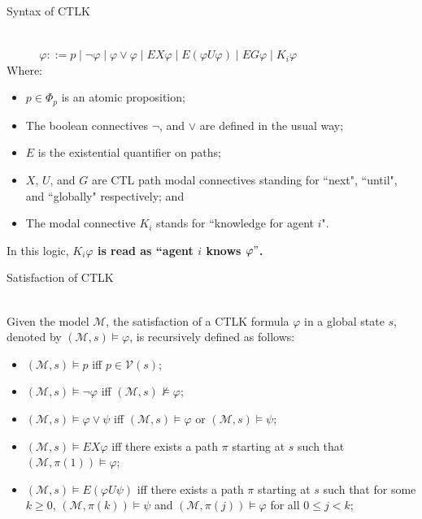 \documentclass{beamer}
\begin{document}
\begin{frame}{Syntax of CTLK}
\begin{definition} \label{Syntax of CTLK}~\\
$~~~~~~~~~~~~~ \varphi ::= p \mid \neg \varphi \mid \varphi \vee
\varphi \mid EX \varphi  \mid E ( \varphi U \varphi) \mid EG
\varphi \mid K_i \varphi$\\
Where:
\begin{itemize}
\item $ p \in \Phi_p$ is an atomic proposition; \item The boolean
connectives $\neg$, and $\vee$ are defined in the usual way; \item
$E$ is the existential quantifier on paths; \item $X$, $U$, and
$G$ are CTL path modal connectives standing for ``next", ``until",
and ``globally" respectively; and \item The modal connective $K_i$
stands for ``knowledge for agent $i$".
\end{itemize}
\label {dfn: Syntax of CTLK}
\end{definition}
In this logic, \textbf{$K_i \varphi$ is read as ``agent $i$ knows
$\varphi"$.}
\end{frame}
\begin{frame}{Satisfaction of CTLK}
\begin{definition} ~\\
Given the model $ \mathcal M$, the satisfaction of a CTLK formula
$ \varphi$ in a global state $ s$, denoted by $ (\mathcal M, s )
\models \varphi$, is recursively defined as follows:

\begin{itemize}
\item $ (\mathcal{M}, s ) \models p$ iff $ p \in \mathcal{V}(s)$;
\item $ (\mathcal{M}, s ) \models \neg \varphi$ iff $ (\mathcal{M}, s ) \nvDash \varphi$;
\item $ (\mathcal{M}, s ) \models \varphi \vee \psi$ iff $(\mathcal{M}, s ) \models \varphi$ or $(\mathcal{M}, s ) \models \psi$;
\item $ (\mathcal{M}, s ) \models EX \varphi $ iff there exists a path $\pi$ starting at $s$ such that $ (\mathcal{M}, \pi(1) ) \models \varphi$;
\item $ (\mathcal{M}, s ) \models E ( \varphi U \psi)$ iff there exists a path $\pi$ starting at $s$ such that for some $ k \geq 0$,
$ (\mathcal{M}, \pi(k) ) \models \psi$ and $ (\mathcal{M}, \pi(j) ) \models \varphi$ for all $ 0 \leq j < k$;

\end{itemize}
\label {dfn: Satisfaction of CTLK}
\end{definition}
\end{frame}
\end{document}
